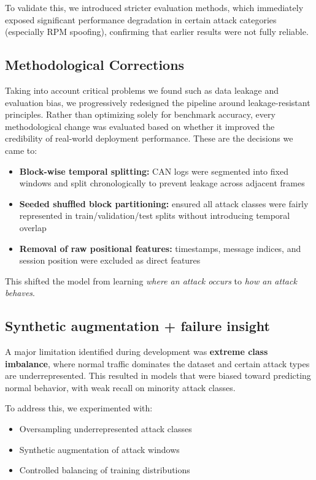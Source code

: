 \documentclass{article}
\begin{document}
To validate this, we introduced stricter evaluation methods, which immediately exposed significant performance degradation in certain attack categories (especially RPM spoofing), confirming that earlier results were not fully reliable.

\subsection{Methodological Corrections}
Taking into account critical problems we found such as data leakage and evaluation bias, we progressively redesigned the pipeline around leakage-resistant principles. Rather than optimizing solely for benchmark accuracy, every methodological change was evaluated based on whether it improved the credibility of real-world deployment performance. These are the decisions we came to:
\begin{itemize}[noitemsep]
    \item \textbf{Block-wise temporal splitting:} CAN logs were segmented into fixed windows and split chronologically to prevent leakage across adjacent frames
    \item \textbf{Seeded shuffled block partitioning:} ensured all attack classes were fairly represented in train/validation/test splits without introducing temporal overlap
    \item \textbf{Removal of raw positional features:} timestamps, message indices, and session position were excluded as direct features
\end{itemize}
This shifted the model from learning \textit{where an attack occurs} to \textit{how an attack behaves}.

\subsection{Synthetic augmentation + failure insight}
A major limitation identified during development was \textbf{extreme class imbalance}, where normal traffic dominates the dataset and certain attack types are underrepresented. This resulted in models that were biased toward predicting normal behavior, with weak recall on minority attack classes.

To address this, we experimented with:
\begin{itemize}[noitemsep]
    \item Oversampling underrepresented attack classes
    \item Synthetic augmentation of attack windows
    \item Controlled balancing of training distributions
\end{itemize}
\end{document}
